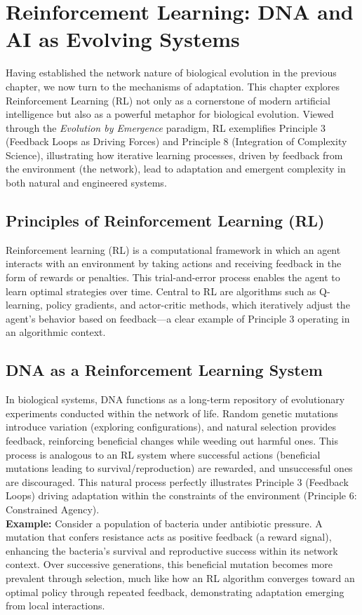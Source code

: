 \chapter{Reinforcement Learning: DNA and AI as Evolving Systems} %
\label{ch:RL}

Having established the network nature of biological evolution in the previous chapter, we now turn to the mechanisms of adaptation. This chapter explores Reinforcement Learning (RL) not only as a cornerstone of modern artificial intelligence but also as a powerful metaphor for biological evolution. Viewed through the \emph{Evolution by Emergence} paradigm, RL exemplifies Principle 3 (Feedback Loops as Driving Forces) and Principle 8 (Integration of Complexity Science), illustrating how iterative learning processes, driven by feedback from the environment (the network), lead to adaptation and emergent complexity in both natural and engineered systems. %

\section{Principles of Reinforcement Learning (RL)}
Reinforcement learning (RL) is a computational framework in which an agent interacts with an environment by taking actions and receiving feedback in the form of rewards or penalties. This trial-and-error process enables the agent to learn optimal strategies over time. Central to RL are algorithms such as Q-learning, policy gradients, and actor-critic methods, which iteratively adjust the agent's behavior based on feedback—a clear example of Principle 3 operating in an algorithmic context. %

\section{DNA as a Reinforcement Learning System}
In biological systems, DNA functions as a long-term repository of evolutionary experiments conducted within the network of life. Random genetic mutations introduce variation (exploring configurations), and natural selection provides feedback, reinforcing beneficial changes while weeding out harmful ones. This process is analogous to an RL system where successful actions (beneficial mutations leading to survival/reproduction) are rewarded, and unsuccessful ones are discouraged. This natural process perfectly illustrates Principle 3 (Feedback Loops) driving adaptation within the constraints of the environment (Principle 6: Constrained Agency). \\[1ex] %
\textbf{Example:} Consider a population of bacteria under antibiotic pressure. A mutation that confers resistance acts as positive feedback (a reward signal), enhancing the bacteria's survival and reproductive success within its network context. Over successive generations, this beneficial mutation becomes more prevalent through selection, much like how an RL algorithm converges toward an optimal policy through repeated feedback, demonstrating adaptation emerging from local interactions.

